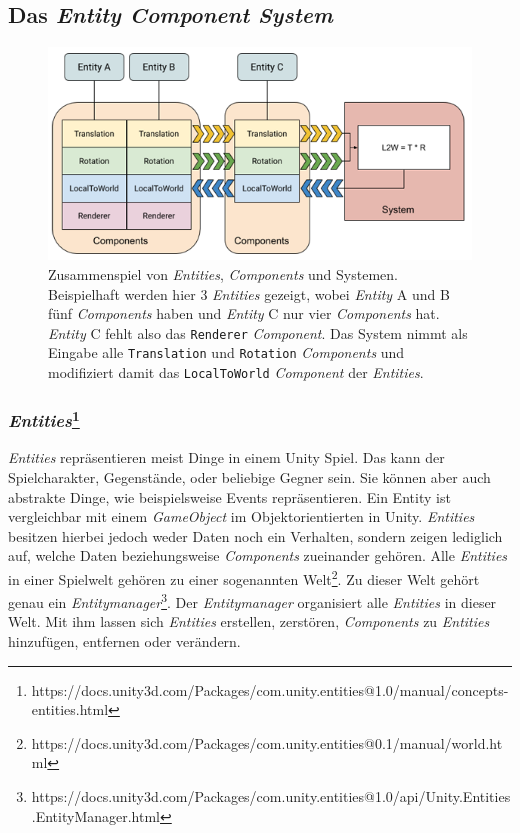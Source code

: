 \subsection{Das \textit{Entity Component System}} \label{ecs}
\begin{figure}[H]
\begin{center}
\includegraphics[scale=0.8]{Bilder/ECSConcept.png}
\caption{Zusammenspiel von \textit{Entities}, \textit{Components} und Systemen. Beispielhaft werden hier 3 \textit{Entities} gezeigt, wobei \textit{Entity} A und B fünf \textit{Components} haben und \textit{Entity} C nur vier \textit{Components} hat. \textit{Entity} C fehlt also das \texttt{Renderer} \textit{Component}. Das System nimmt als Eingabe alle \texttt{Translation} und \texttt{Rotation} \textit{Components} und modifiziert damit das \texttt{LocalToWorld} \textit{Component} der \textit{Entities}.}
\label{fig:ecs_concept}
\end{center}
\end{figure}
\subsubsection{\textit{Entities}\footnote{https://docs.unity3d.com/Packages/com.unity.entities@1.0/manual/concepts-entities.html}}\textit{Entities} repräsentieren meist Dinge in einem Unity Spiel. Das kann der Spielcharakter, Gegenstände, oder beliebige Gegner sein. Sie können aber auch abstrakte Dinge, wie beispielsweise Events repräsentieren. Ein Entity ist vergleichbar mit einem \textit{GameObject} im Objektorientierten in Unity. \textit{Entities} besitzen hierbei jedoch weder Daten noch ein Verhalten, sondern zeigen lediglich auf, welche Daten beziehungsweise \textit{Components} zueinander gehören. Alle \textit{Entities} in einer Spielwelt gehören zu einer sogenannten Welt\footnote{https://docs.unity3d.com/Packages/com.unity.entities@0.1/manual/world.html}. Zu dieser Welt gehört genau ein \textit{Entitymanager}\footnote{https://docs.unity3d.com/Packages/com.unity.entities@1.0/api/Unity.Entities.EntityManager.html}. Der \textit{Entitymanager} organisiert alle \textit{Entities} in dieser Welt. Mit ihm lassen sich \textit{Entities} erstellen, zerstören, \textit{Components} zu \textit{Entities} hinzufügen, entfernen oder verändern.
